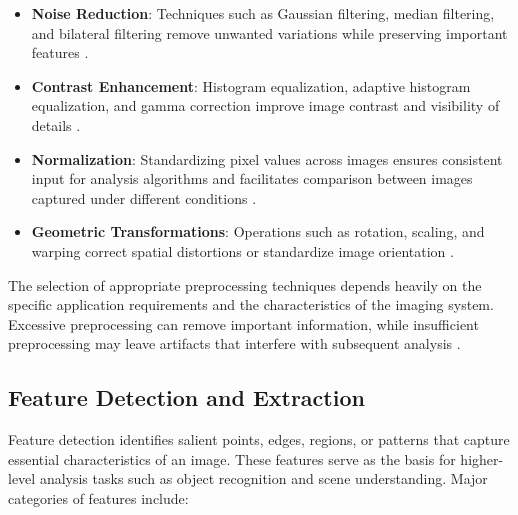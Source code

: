 \begin{itemize}
    \item \textbf{Noise Reduction}: Techniques such as Gaussian filtering, median filtering, and bilateral filtering remove unwanted variations while preserving important features \cite{buades2005non}.
    
    \item \textbf{Contrast Enhancement}: Histogram equalization, adaptive histogram equalization, and gamma correction improve image contrast and visibility of details \cite{pizer1987adaptive}.
    
    \item \textbf{Normalization}: Standardizing pixel values across images ensures consistent input for analysis algorithms and facilitates comparison between images captured under different conditions \cite{pratt2007digital}.
    
    \item \textbf{Geometric Transformations}: Operations such as rotation, scaling, and warping correct spatial distortions or standardize image orientation \cite{hartley2003multiple}.
\end{itemize}

The selection of appropriate preprocessing techniques depends heavily on the specific application requirements and the characteristics of the imaging system. Excessive preprocessing can remove important information, while insufficient preprocessing may leave artifacts that interfere with subsequent analysis \cite{gonzalez2018digital}.

\subsection{Feature Detection and Extraction}
Feature detection identifies salient points, edges, regions, or patterns that capture essential characteristics of an image. These features serve as the basis for higher-level analysis tasks such as object recognition and scene understanding. Major categories of features include:

